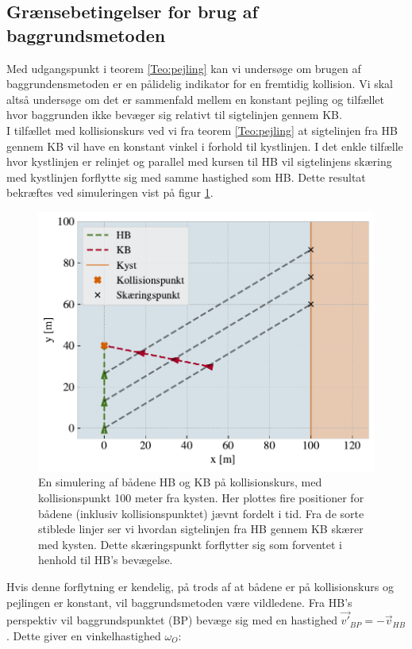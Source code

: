 \documentclass[%
 reprint,
nofootinbib,
aps,
]{revtex4-1}
\begin{document}
 \subsection{Grænsebetingelser for brug af baggrundsmetoden}
 Med udgangspunkt i teorem \ref{Teo:pejling} kan vi undersøge om brugen af baggrundensmetoden er en pålidelig indikator for en fremtidig kollision. Vi skal altså undersøge om det er sammenfald mellem en konstant pejling og tilfællet hvor baggrunden ikke bevæger sig relativt til sigtelinjen gennem KB. \\
 I tilfællet med kollisionskurs ved vi fra teorem \ref{Teo:pejling} at sigtelinjen fra HB gennem KB vil have en konstant vinkel i forhold til kystlinjen. I det enkle tilfælle hvor kystlinjen er relinjet og parallel med kursen til HB vil sigtelinjens skæring med kystlinjen forflytte sig med samme hastighed som HB. Dette resultat bekræftes ved simuleringen vist på figur \ref{fig:eks1}.
 \begin{figure}[H]
   \includegraphics[width=\linewidth]{figures/eksempel1.pdf}
   \caption{En simulering af bådene HB og KB på kollisionskurs, med kollisionspunkt 100 meter fra kysten. Her plottes fire positioner for bådene (inklusiv kollisionspunktet) jævnt fordelt i tid. Fra de sorte stiblede linjer ser vi hvordan sigtelinjen fra HB gennem KB skærer med kysten. Dette skæringspunkt forflytter sig som forventet i henhold til HB's bevægelse.}
   \label{fig:eks1}
 \end{figure}
 Hvis denne forflytning er kendelig, på trods af at bådene er på kollisionskurs og pejlingen er konstant, vil baggrundsmetoden være vildledene. Fra HB's perspektiv vil baggrundspunktet (BP) bevæge sig med en hastighed $\vec{v'}_{BP} = - \vec{v}_{HB}$. Dette giver en vinkelhastighed $\omega_O$:
\end{document}
